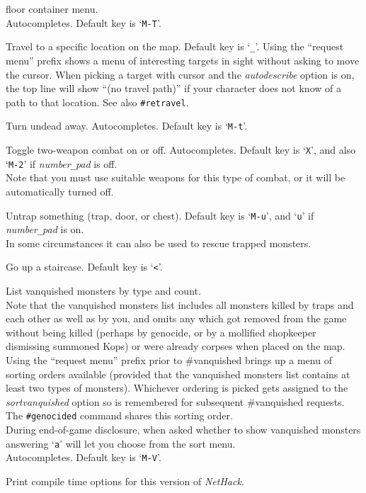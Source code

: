 floor container menu.
\\
Autocompletes. Default key is `{\tt M-T}'.
\item[\tb{\#travel}]
Travel to a specific location on the map.
Default key is `{\tt \verb+_+}'.
Using the ``request menu'' prefix shows a menu of interesting targets in sight
without asking to move the cursor.
When picking a target with cursor and the {\it autodescribe\/}
option is on, the top line will show ``(no travel path)'' if
your character does not know of a path to that location.
See also {\tt \#retravel}.
\item[\tb{\#turn}]
Turn undead away. Autocompletes. Default key is `{\tt M-t}'.
\item[\tb{\#twoweapon}]
Toggle two-weapon combat on or off. Autocompletes.
Default key is `{\tt X}',
and also `{\tt M-2}' if {\it number\verb+_+pad\/} is off.\\
Note that you must
use suitable weapons for this type of combat, or it will
be automatically turned off.
\item[\tb{\#untrap}]
Untrap something (trap, door, or chest).
Default key is `{\tt M-u}', and `{\tt u}' if {\it number\verb+_+pad\/} is on.\\
In some circumstances it can also be used to rescue trapped monsters.
\item[\tb{\#up}]
Go up a staircase. Default key is `{\tt <}'.
\item[\tb{\#vanquished}]
List vanquished monsters by type and count.
\\
Note that the vanquished monsters list includes all monsters killed by
traps and each other as well as by you, and omits any which got removed
from the game without being killed (perhaps by genocide, or by a mollified
shopkeeper dismissing summoned Kops) or were already corpses when placed
on the map.
\\
Using the ``request menu'' prefix prior to \#vanquished brings up
a menu of sorting orders available (provided that the vanquished monsters
list contains at least two types of monsters).
Whichever ordering is picked gets assigned to the {\it sortvanquished}
option so is remembered for subsequent \#vanquished requests.
The {\tt \#genocided} command shares this sorting order.
\\
During end-of-game disclosure, when asked whether to show vanquished
monsters answering `{\tt a}' will let you choose from the sort menu.
\\
Autocompletes.
Default key is `{\tt M-V}'.
\item[\tb{\#version}]
Print compile time options for this version of {\it NetHack\/}.

